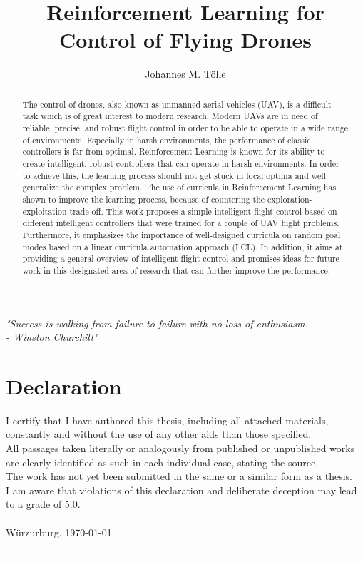 \documentclass[bachelor,english]{infothesis}
\title{Reinforcement Learning for Control of Flying Drones}
\author{Johannes M. Tölle}
\newenvironment{declaration}
{\chapter*{Declaration}}
{}
\begin{document}
\vspace*{\fill}
\begin{center}
	\Huge
	\emph{"Success is walking from failure to failure with no loss of enthusiasm.\\
	\qquad \qquad \qquad- Winston Churchill"}
\end{center}
\vspace*{\fill}
\thispagestyle{empty}
\newpage
{}
	
\begin{declaration}
	I certify that I have authored this thesis, including all attached materials,
	constantly and without the use of any other aids than those specified.\\
	All passages taken literally or analogously from published or unpublished works
	are clearly identified as such in each individual case, stating the source.\\
	The work has not yet been submitted in the same or a similar form as a thesis.\\
	I am aware that violations of this declaration and deliberate deception may lead to
	a grade of 5.0.\\
	\vspace*{12cm}\\
	Würzurburg, \today 
	\hspace*{\fill}\begin{tabular}{@{}l@{}}\hline
	\makebox[4cm]{Johannes M. Tölle}
	\end{tabular}
\end{declaration}

\tableofcontents
\listoffigures
\listoftables
\listofalgorithms

\begin{abstract}
	The control of drones, also known as unmanned aerial vehicles (UAV), 
	is a difficult task which is of great interest to modern research.
	Modern UAVs are in need of reliable, precise, and robust flight control in order to
	be able to operate in a wide range of environments. Especially in harsh environments,
	the performance of classic controllers is far from optimal.
	Reinforcement Learning is known for its ability to create intelligent, robust
	controllers that can operate in harsh environments. In order to achieve this, the learning process
	should not get stuck in local optima and well generalize the complex problem. The use 
	of curricula in Reinforcement Learning has shown to improve the learning process, because
	of countering the exploration-exploitation trade-off.
	This work proposes a simple intelligent flight control based on 
	different intelligent controllers that were trained for
	a couple of UAV flight problems. Furthermore, it emphasizes the importance of 
	well-designed curricula on random goal modes based on a linear curricula automation approach (LCL).
	In addition, it aims at providing a general overview of intelligent flight
	control and promises ideas for future work in this designated area of research that can further improve 
	the performance.
\end{abstract}
\end{document}

